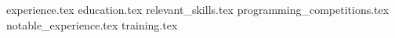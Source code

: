 \documentclass[11pt, a4papter]{awesome-cv}
\newcommand*{\sectiondir}{sections/}
\begin{document}
\makecvheader

{experience.tex}
{education.tex}
{relevant_skills.tex}
{programming_competitions.tex}
{notable_experience.tex}
{training.tex}
\end{document}
